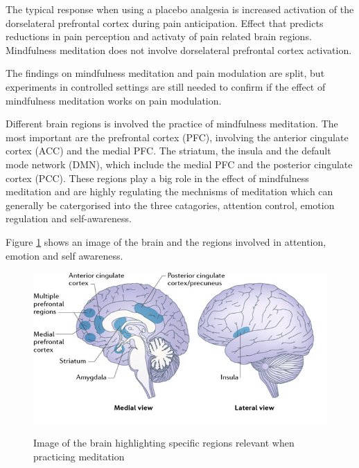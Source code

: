 The typical response when using a placebo analgesia is increased activation of the dorselateral prefrontal cortex during pain anticipation. Effect that predicts reductions in pain perception and activaty of pain related brain regions. Mindfulness meditation does not involve dorselateral prefrontal cortex activation. \cite{Zeidan2012}

The findings on mindfulness meditation and pain modulation are split, but experiments in controlled settings are still needed to confirm if the effect of mindfulness meditation works on pain modulation. \cite{Zeidan2012, Perlman2010}



Different brain regions is involved the practice of mindfulness meditation. The most important are the prefrontal cortex (PFC), involving the anterior cingulate cortex (ACC) and the medial PFC. The striatum, the insula and the default mode network (DMN), which include the medial PFC and the posterior cingulate cortex (PCC). These regions play a big role in the effect of mindfulness meditation and are highly regulating the mechnisms of meditation which can generally be catergorised into the three catagories, attention control, emotion regulation and self-awareness. 

Figure \ref{fig:brain_meditation} shows an image of the brain and the regions involved in attention, emotion and self awareness. 

\begin{figure}[H]
	\includegraphics[width=1\textwidth]{figures/brain_meditation.png} 
	\caption{Image of the brain highlighting specific regions relevant when practicing meditation}
	\label{fig:brain_meditation}  
	\cite{Tang2017}
\end{figure}   

